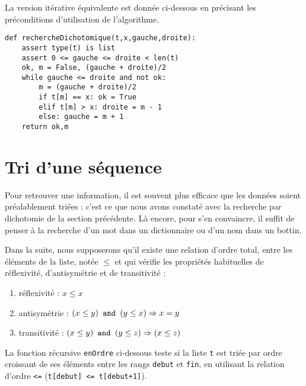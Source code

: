 
La version itérative équivalente est donnée ci-dessous en précisant les préconditions
d'utilisation de l'algorithme.

\newpage
{}
\begin{lstlisting}[title={\bf Recherche dichotomique}]
def rechercheDichotomique(t,x,gauche,droite):
    assert type(t) is list
    assert 0 <= gauche <= droite < len(t)
    ok, m = False, (gauche + droite)/2
    while gauche <= droite and not ok:
        m = (gauche + droite)/2
        if t[m] == x: ok = True
        elif t[m] > x: droite = m - 1
        else: gauche = m + 1
    return ok,m
\end{lstlisting}


\section{Tri d'une séquence}\label{tri}
Pour retrouver une information, il est souvent plus efficace que les données soient
préala\-ble\-ment triées : c'est ce que nous avons constaté avec la recherche
par dichotomie de la section précédente. Là encore, pour s'en convaincre, il suffit 
de penser à la recherche d'un mot dans un dictionnaire ou d'un nom dans un bottin.

Dans la suite, nous supposerons qu'il existe une relation d'ordre total, 
entre les éléments de la liste, notée $\leq$ et qui vérifie les propriétés 
habituelles de réflexivité, d'antisymétrie et de transitivité :
\begin{enumerate}
\item réflexivité : $x \leq x$
\item antisymétrie : $(x \leq y) \mbox{\tt\ and\ } (y \leq x) \Rightarrow x = y$
\item transitivit\'e : $(x \leq y) \mbox{\tt\ and\ } (y \leq z) \Rightarrow (x \leq z)$
\end{enumerate}
La fonction récursive {\tt enOrdre} ci-dessous teste si la liste {\tt t} est triée par
ordre croissant de ses éléments entre les rangs {\tt debut} et {\tt fin}, 
en utilisant la relation d'ordre {\tt <=} ({\tt t[debut] <= t[debut+1]}).

